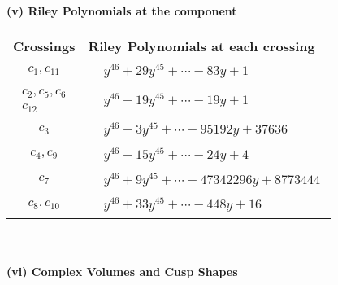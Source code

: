 \documentclass[1p]{elsarticle_modified}
\theoremstyle{definition}
\begin{document}
\newpage\renewcommand{\arraystretch}{1}
\flushleft \textbf{(v) Riley Polynomials at the component}\newline \\
\begin{tabular}{m{50pt}|m{274pt}}
Crossings & \hspace{64pt}Riley Polynomials at each crossing \\
\hline $$\begin{aligned}c_{1},c_{11}\end{aligned}$$&$\begin{aligned}
&y^{46}+29 y^{45}+\cdots-83 y+1
\end{aligned}$\\
\hline $$\begin{aligned}c_{2},c_{5},c_{6}\\c_{12}\end{aligned}$$&$\begin{aligned}
&y^{46}-19 y^{45}+\cdots-19 y+1
\end{aligned}$\\
\hline $$\begin{aligned}c_{3}\end{aligned}$$&$\begin{aligned}
&y^{46}-3 y^{45}+\cdots-95192 y+37636
\end{aligned}$\\
\hline $$\begin{aligned}c_{4},c_{9}\end{aligned}$$&$\begin{aligned}
&y^{46}-15 y^{45}+\cdots-24 y+4
\end{aligned}$\\
\hline $$\begin{aligned}c_{7}\end{aligned}$$&$\begin{aligned}
&y^{46}+9 y^{45}+\cdots-47342296 y+8773444
\end{aligned}$\\
\hline $$\begin{aligned}c_{8},c_{10}\end{aligned}$$&$\begin{aligned}
&y^{46}+33 y^{45}+\cdots-448 y+16
\end{aligned}$\\
\hline
\end{tabular}\\~\\
\newpage\flushleft \textbf{(vi) Complex Volumes and Cusp Shapes}
\end{document}
